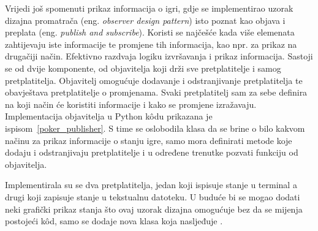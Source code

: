 Vrijedi još spomenuti prikaz informacija o igri, gdje se implementirao uzorak dizajna promatrača (eng. \textit{observer design pattern}) isto poznat kao objava i preplata (eng. \textit{publish and subscribe}). Koristi se najčešće kada više elemenata zahtijevaju iste informacije te promjene tih informacija, kao npr. za prikaz na drugačiji način. Efektivno razdvaja logiku izvršavanja i prikaz informacija. Sastoji se od dvije komponente, od objavitelja koji drži sve pretplatitelje i samog pretplatitelja. Objavitelj omogućuje dodavanje i odstranjivanje pretplatitelja te obavještava pretplatitelje o promjenama. Svaki pretplatitelj sam za sebe definira na koji način će koristiti informacije i kako se promjene izražavaju. Implementacija objavitelja u Python k\^odu prikazana je ispisom~\ref{poker_publisher}. S time se oslobodila klasa  da se brine o bilo kakvom načinu za prikaz informacije o stanju igre, samo mora definirati metode koje dodaju i odstranjivaju pretplatitelje i u određene trenutke pozvati  funkciju od objavitelja.


Implementirala su se dva pretplatitelja, jedan koji ispisuje stanje u terminal a drugi koji zapisuje stanje u tekstualnu datoteku. U buduće bi se mogao dodati neki grafički prikaz stanja što ovaj uzorak dizajna omogućuje bez da se mijenja postojeći k\^od, samo se dodaje nova klasa koja nasljeđuje .

